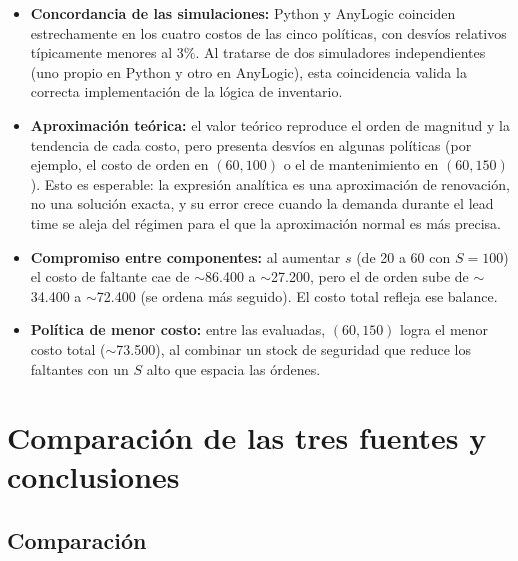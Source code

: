 \documentclass[11pt,a4paper]{article}
\begin{document}
\begin{itemize}
    \item \textbf{Concordancia de las simulaciones:} Python y AnyLogic
          coinciden estrechamente en los cuatro costos de las cinco
          políticas, con desvíos relativos típicamente menores al 3\%. Al
          tratarse de dos simuladores independientes (uno propio en Python y
          otro en AnyLogic), esta coincidencia valida la correcta
          implementación de la lógica de inventario.
    \item \textbf{Aproximación teórica:} el valor teórico reproduce el orden
          de magnitud y la tendencia de cada costo, pero presenta desvíos en
          algunas políticas (por ejemplo, el costo de orden en $(60,100)$ o
          el de mantenimiento en $(60,150)$). Esto es esperable: la
          expresión analítica es una aproximación de renovación, no una
          solución exacta, y su error crece cuando la demanda durante el
          lead time se aleja del régimen para el que la aproximación normal
          es más precisa.
    \item \textbf{Compromiso entre componentes:} al aumentar $s$ (de 20 a 60
          con $S=100$) el costo de faltante cae de $\sim$86.400 a
          $\sim$27.200, pero el de orden sube de $\sim$34.400 a
          $\sim$72.400 (se ordena más seguido). El costo total refleja ese
          balance.
    \item \textbf{Política de menor costo:} entre las evaluadas, $(60,150)$
          logra el menor costo total ($\sim$73.500), al combinar un stock de
          seguridad que reduce los faltantes con un $S$ alto que espacia las
          órdenes.
\end{itemize}

\section{Comparación de las tres fuentes y conclusiones}

\subsection{Comparación}
\end{document}
